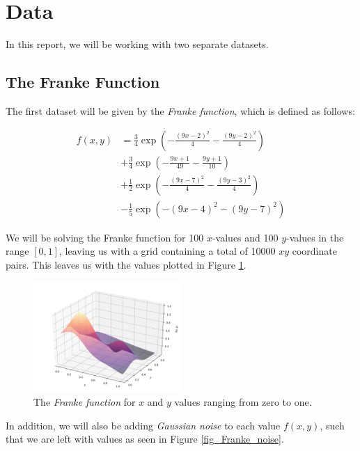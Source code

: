\documentclass[a4paper,10pt,english]{article}
\begin{document}




\section{Data}
\label{sec:data}

In this report, we will be working with two separate datasets.

\subsection{The Franke Function}

The first dataset will be given by the \textit{Franke function}, which is defined as follows:

\begin{align*}
f(x,y) &= \frac{3}{4} \exp \left( -\frac{(9x-2)^2}{4} -\frac{(9y-2)^2}{4} \right) \\ &+ \frac{3}{4} \exp \left( -\frac{9x+1}{49} -\frac{9y+1}{10} \right) \\ &+ \frac{1}{2} \exp \left( -\frac{(9x-7)^2}{4} -\frac{(9y-3)^2}{4} \right) \\ &- \frac{1}{5} \exp \left( -(9x-4)^2 - (9y-7)^2 \right)
\end{align*}

We will be solving the Franke function for 100 $x$-values and 100 $y$-values in the range $[0,1]$, leaving us with a grid containing a total of 10000 $xy$ coordinate pairs.  This leaves us with the values plotted in Figure \ref{fig_Franke}.

\begin{figure}[H]
	\centering
	\includegraphics[width = 0.5\textwidth, center]{Franke.png}
	\caption{The \textit{Franke function} for $x$ and $y$ values ranging from zero to one. \label{fig_Franke}}
\end{figure}


In addition, we will also be adding \textit{Gaussian noise} to each value $f(x,y)$, such that we are left with values as seen in Figure \ref{fig_Franke_noise}.
\end{document}
